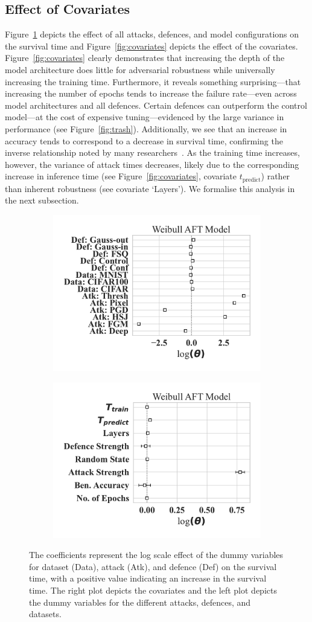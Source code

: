 \subsection{Effect of Covariates}
Figure~\ref{fig:dummies} depicts the effect of all attacks, defences, and model configurations on the survival time and Figure~\ref{fig:covariates} depicts the effect of the covariates.
Figure~\ref{fig:covariates} clearly demonstrates that increasing the depth of the model architecture does little for adversarial robustness while universally increasing the training time.
Furthermore, it reveals something surprising---that increasing the number of epochs tends to increase the failure rate---even across model architectures and all defences.
Certain defences can outperform the control model---at the cost of expensive tuning---evidenced by the large variance in performance (see Figure~\ref{fig:trash}). 
Additionally, we see that an increase in accuracy tends to correspond to a decrease in survival time, confirming the inverse relationship noted by many researchers~\cite{carlini_towards_2017,biggio_evasion_2013,meyers}. 
As the training time increases, however, the variance of attack times decreases, likely due to the corresponding increase in inference time (see Figure~\ref{fig:covariates}, covariate $t_{\mathrm{predict}}$) rather than inherent robustness (see covariate `Layers').
We formalise this analysis in the next subsection.

\begin{figure}
    \centering
	\begin{subfigure}
	\centering
    \includegraphics[width=.32\textwidth]{plots/weibull_aft_dummies.pdf}
    \end{subfigure}
    \begin{subfigure}
	\centering
    \includegraphics[width=.32\textwidth]{plots/weibull_aft.pdf}
    \end{subfigure}
    \caption{The coefficients represent the log scale effect of the dummy variables for dataset (Data), attack (Atk), and defence (Def) on the survival time, with a positive value indicating an increase in the survival time. The right plot depicts the covariates and the left plot depicts the dummy variables for the different attacks, defences, and datasets.}
    \label{fig:covariates}
    \label{fig:dummies}
\end{figure}

